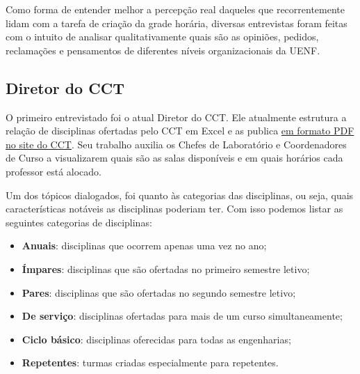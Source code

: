 
    Como forma de entender melhor a percepção real daqueles que recorrentemente lidam com a tarefa de criação da grade horária, diversas entrevistas foram feitas com o intuito de analisar qualitativamente quais são as opiniões, pedidos, reclamações e pensamentos de diferentes níveis organizacionais da UENF.

    \subsection{Diretor do CCT} %


        O primeiro entrevistado foi o atual Diretor do CCT. Ele atualmente estrutura a relação de disciplinas ofertadas pelo CCT em Excel e as publica \href{https://uenf.br/cct/secretaria-academica/distribuicao-das-salas-de-aula-do-cct/}{em formato PDF no site do CCT}. Seu trabalho auxilia os Chefes de Laboratório e Coordenadores de Curso a visualizarem quais são as salas disponíveis e em quais horários cada professor está alocado.

        Um dos tópicos dialogados, foi quanto às categorias das disciplinas, ou seja, quais características notáveis as disciplinas poderiam ter. Com isso podemos listar as seguintes categorias de disciplinas:

        \begin{itemize}
            \item \textbf{Anuais}: disciplinas que ocorrem apenas uma vez no ano;
            \item \textbf{Ímpares}: disciplinas que são ofertadas no primeiro semestre letivo;
            \item \textbf{Pares}: disciplinas que são ofertadas no segundo semestre letivo;
            \item \textbf{De serviço}: disciplinas ofertadas para mais de um curso simultaneamente;
            \item \textbf{Ciclo básico}: disciplinas oferecidas para todas as engenharias;
            \item \textbf{Repetentes}: turmas criadas especialmente para repetentes.
        \end{itemize}


